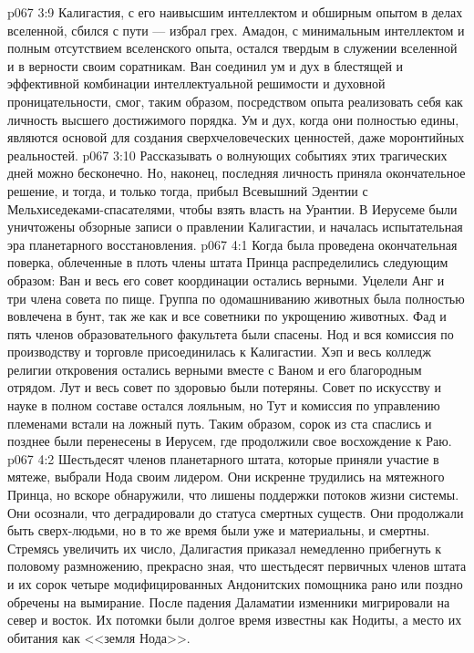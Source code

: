 \vs p067 3:9 Калигастия, с его наивысшим интеллектом и обширным опытом в делах вселенной, сбился с пути --- избрал грех. Амадон, с минимальным интеллектом и полным отсутствием вселенского опыта, остался твердым в служении вселенной и в верности своим соратникам. Ван соединил ум и дух в блестящей и эффективной комбинации интеллектуальной решимости и духовной проницательности, смог, таким образом, посредством опыта реализовать себя как личность высшего достижимого порядка. Ум и дух, когда они полностью едины, являются основой для создания сверхчеловеческих ценностей, даже моронтийных реальностей.
\vs p067 3:10 Рассказывать о волнующих событиях этих трагических дней можно бесконечно. Но, наконец, последняя личность приняла окончательное решение, и тогда, и только тогда, прибыл Всевышний Эдентии с Мельхиседеками\hyp{}спасателями, чтобы взять власть на Урантии. В Иерусеме были уничтожены обзорные записи о правлении Калигастии, и началась испытательная эра планетарного восстановления.
\vs p067 4:1 Когда была проведена окончательная поверка, облеченные в плоть члены штата Принца распределились следующим образом: Ван и весь его совет координации остались верными. Уцелели Анг и три члена совета по пище. Группа по одомашниванию животных была полностью вовлечена в бунт, так же как и все советники по укрощению животных. Фад и пять членов образовательного факультета были спасены. Нод и вся комиссия по производству и торговле присоединилась к Калигастии. Хэп и весь колледж религии откровения остались верными вместе с Ваном и его благородным отрядом. Лут и весь совет по здоровью были потеряны. Совет по искусству и науке в полном составе остался лояльным, но Тут и комиссия по управлению племенами встали на ложный путь. Таким образом, сорок из ста спаслись и позднее были перенесены в Иерусем, где продолжили свое восхождение к Раю.
\vs p067 4:2 Шестьдесят членов планетарного штата, которые приняли участие в мятеже, выбрали Нода своим лидером. Они искренне трудились на мятежного Принца, но вскоре обнаружили, что лишены поддержки потоков жизни системы. Они осознали, что деградировали до статуса смертных существ. Они продолжали быть сверх\hyp{}людьми, но в то же время были уже и материальны, и смертны. Стремясь увеличить их число, Далигастия приказал немедленно прибегнуть к половому размножению, прекрасно зная, что шестьдесят первичных членов штата и их сорок четыре модифицированных Андонитских помощника рано или поздно обречены на вымирание. После падения Даламатии изменники мигрировали на север и восток. Их потомки были долгое время известны как Нодиты, а место их обитания как <<земля Нода>>.
